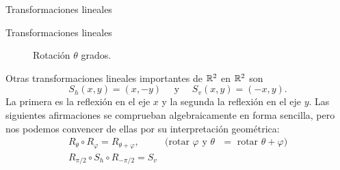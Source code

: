 \begin{chapter}{Transformaciones lineales}
\begin{section}{Transformaciones lineales}
\begin{ejemplo}
                
                    \begin{figure}[h]
                    	\centering	
                    \caption{Rotación  $\theta$ grados. }
                    \label{rotacion-theta}
                \end{figure}
                
                
                
                Otras transformaciones lineales importantes de $\mathbb R^2$ en $\mathbb R^2$ son 
                $$
                S_h(x,y) = (x,-y) \quad \text{ y } \quad S_v(x,y) = (-x,y).
                $$
                La primera es la reflexión en el eje $x$ y la segunda la reflexión en el eje $y$. Las siguientes afirmaciones se comprueban algebraicamente en forma sencilla, pero nos podemos convencer de ellas por su interpretación geométrica:
                \begin{equation*}
                \begin{array}{ll}
                R_\theta \circ R_\varphi = R_{\theta +\varphi}, \quad &\text{(rotar $\varphi$ y $\theta$ $=$  rotar $\theta+\varphi$)} \\
                R_{\pi/2} \circ S_h \circ R_{-\pi/2} = S_v&
                \end{array}
                \end{equation*}
                
            \end{ejemplo}
    

\end{section}
\end{chapter}
